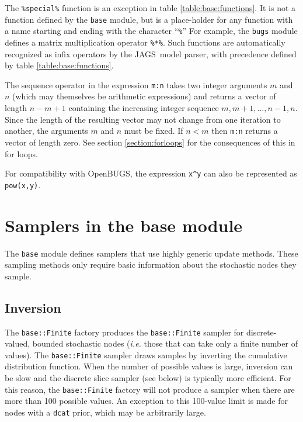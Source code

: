 \documentclass[11pt, a4paper, titlepage]{report}
\newcommand{\JAGS}{\textsf{JAGS}}
\begin{document}
The \verb+%special%+ function is an exception in table
\ref{table:base:functions}. It is not a function defined by the
\verb+base+ module, but is a place-holder for any function with a name
starting and ending with the character ``\verb+%+'' For example, the
\texttt{bugs} module defines a matrix multiplication operator
\verb+%*%+. Such functions are automatically recognized as infix
operators by the \JAGS\ model parser, with precedence defined by table
\ref{table:base:functions}.

The sequence operator in the expression \verb+m:n+ takes two integer
arguments $m$ and $n$ (which may themselves be arithmetic expressions)
and returns a vector of length $n - m + 1$ containing the increasing
integer sequence $m, m+1, \ldots, n-1, n$. Since the length of the
resulting vector may not change from one iteration to another, the
arguments $m$ and $n$ must be fixed.  If $n < m$ then \verb+m:n+
returns a vector of length zero. See section \ref{section:forloops}
for the consequences of this in for loops.

For compatibility with OpenBUGS, the expression \verb+x^y+ can also be
represented as \texttt{pow(x,y)}.

\section{Samplers in the base module}

The \texttt{base} module defines samplers that use highly generic update
methods.  These sampling methods only require basic information about
the stochastic nodes they sample.  

\subsection{Inversion}

The \texttt{base::Finite} factory produces the \texttt{base::Finite}
sampler for discrete-valued, bounded stochastic nodes ({\em i.e.}
those that can take only a finite number of values). The
\texttt{base::Finite} sampler draws samples by inverting the
cumulative distribution function. When the number of possible values
is large, inversion can be slow and the discrete slice sampler (see
below) is typically more efficient. For this reason, the
\texttt{base::Finite} factory will not produce a sampler when there
are more than 100 possible values. An exception to this 100-value
limit is made for nodes with a \texttt{dcat} prior, which may be
arbitrarily large.
\end{document}
